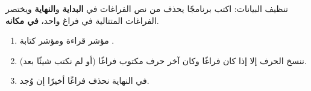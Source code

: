 \begin{statement}
تنظيف البيانات: اكتب برنامجًا يحذف من نص الفراغات في \textbf{البداية} و\textbf{النهاية} ويختصر الفراغات المتتالية في فراغ واحد، \textbf{في مكانه}.
\end{statement}
\begin{stepsbox}\begin{enumerate}
\item مؤشر قراءة  ومؤشر كتابة .
\item ننسخ الحرف إلا إذا كان فراغًا وكان آخر حرف مكتوب فراغًا (أو لم نكتب شيئًا بعد).
\item في النهاية نحذف فراغًا أخيرًا إن وُجد.
\end{enumerate}\end{stepsbox}
